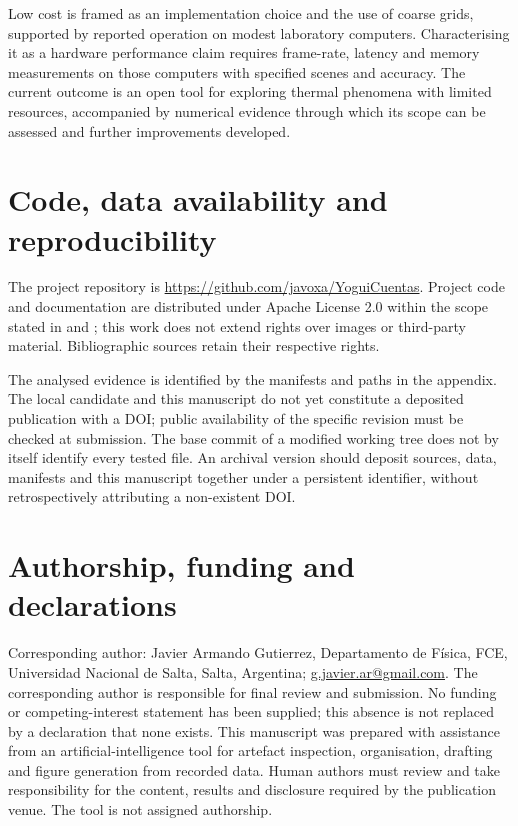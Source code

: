 \documentclass[11pt,a4paper]{article}
\newcommand{\code}[1]{\texttt{\detokenize{#1}}}
\newcommand{\repo}{\url{https://github.com/javoxa/YoguiCuentas}}
\begin{document}
Low cost is framed as an implementation choice and the use of coarse grids, supported by reported operation on modest laboratory computers. Characterising it as a hardware performance claim requires frame-rate, latency and memory measurements on those computers with specified scenes and accuracy. The current outcome is an open tool for exploring thermal phenomena with limited resources, accompanied by numerical evidence through which its scope can be assessed and further improvements developed.

\section*{Code, data availability and reproducibility}
The project repository is \repo. Project code and documentation are distributed under Apache License 2.0 within the scope stated in \code{LICENSE} and \code{NOTICE}; this work does not extend rights over images or third-party material. Bibliographic sources retain their respective rights.

The analysed evidence is identified by the manifests and paths in the appendix. The local candidate and this manuscript do not yet constitute a deposited publication with a DOI; public availability of the specific revision must be checked at submission. The base commit of a modified working tree does not by itself identify every tested file. An archival version should deposit sources, data, manifests and this manuscript together under a persistent identifier, without retrospectively attributing a non-existent DOI.

\section*{Authorship, funding and declarations}
Corresponding author: Javier Armando Gutierrez, Departamento de Física, FCE, Universidad Nacional de Salta, Salta, Argentina; \href{mailto:g.javier.ar@gmail.com}{g.javier.ar@gmail.com}. The corresponding author is responsible for final review and submission. No funding or competing-interest statement has been supplied; this absence is not replaced by a declaration that none exists. This manuscript was prepared with assistance from an artificial-intelligence tool for artefact inspection, organisation, drafting and figure generation from recorded data. Human authors must review and take responsibility for the content, results and disclosure required by the publication venue. The tool is not assigned authorship.
\end{document}
